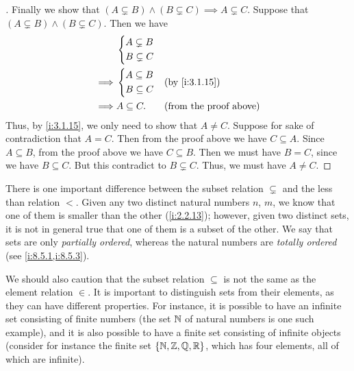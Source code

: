 \begin{proof}[]
  Finally we show that \((A \subsetneq B) \land (B \subsetneq C) \implies A \subsetneq C\).
  Suppose that  \((A \subsetneq B) \land (B \subsetneq C)\).
  Then we have
  \begin{align*}
             & \begin{dcases}
                 A \subsetneq B \\
                 B \subsetneq C
               \end{dcases}                                       \\
    \implies & \begin{dcases}
                 A \subseteq B \\
                 B \subseteq C
               \end{dcases}  &  & \by{i:3.1.15}                     \\
    \implies & A \subseteq C.    &  & \text{(from the proof above)}
  \end{align*}
  Thus, by \cref{i:3.1.15}, we only need to show that \(A \neq C\).
  Suppose for sake of contradiction that \(A = C\).
  Then from the proof above we have \(C \subseteq A\).
  Since \(A \subseteq B\), from the proof above we have \(C \subseteq B\).
  Then we must have \(B = C\), since we have \(B \subseteq C\).
  But this contradict to \(B \subsetneq C\).
  Thus, we must have \(A \neq C\).
\end{proof}

\setcounter{thm}{19}
\begin{rmk}\label{i:3.1.20}
  There is one important difference between the subset relation \(\subsetneq\) and the less than relation \(<\).
  Given any two distinct natural numbers \(n\), \(m\), we know that one of them is smaller than the other (\cref{i:2.2.13});
  however, given two distinct sets, it is not in general true that one of them is a subset of the other.
  We say that sets are only \emph{partially ordered}, whereas the natural numbers are \emph{totally ordered} (see \cref{i:8.5.1,i:8.5.3}).
\end{rmk}

\begin{rmk}\label{i:3.1.21}
  We should also caution that the subset relation \(\subseteq\) is not the same as the element relation \(\in\).
  It is important to distinguish sets from their elements, as they can have different properties.
  For instance, it is possible to have an infinite set consisting of finite numbers (the set \(\mathbb{N}\) of natural numbers is one such example), and it is also possible to have a finite set consisting of infinite objects
  (consider for instance the finite set \(\left\lbrace\mathbb{N}, \mathbb{Z}, \mathbb{Q}, \mathbb{R}\right\rbrace\), which has four elements, all of which are infinite).
\end{rmk}

